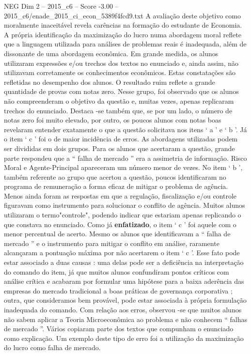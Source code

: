 \begin{textsample}{NEG Dim 2 – 2015\_c6 – Score -3.00 – 2015\_c6/enade\_2015\_ci\_econ\_5389f4fcd9.txt}
A avaliação deste objetivo como moralmente inaceitável revela carências na formação do estudante de Economia.
A própria identificação da maximização do lucro numa abordagem moral reflete que a linguagem utilizada para análises de problemas reais é inadequada, além de dissonante de uma abordagem econômica.
Em grande medida, os alunos utilizaram expressões e/ou trechos dos textos no enunciado e, ainda assim, não utilizavam corretamente os conhecimentos econômicos.
Estas constatações são refletidas no desempenho dos alunos.
O resultado ruim reflete a grande quantidade de provas com notas zero.
Nesse grupo, foi observado que os alunos não compreenderam o objetivo da questão e, muitas vezes, apenas replicaram trechos do enunciado.
Destaca -se também que, se por um lado, o número de notas zero foi muito elevado, por outro, os poucos alunos com notas boas revelaram entender exatamente o que a questão solicitava nos itens ‘ a ’ e ‘ b ’.
Já o item ‘ c ’ foi o de maior incidência de erros.
As abordagens utilizadas podem ser divididas em dois grupos.
Para os alunos que acertaram a questão, grande parte respondeu que a “ falha de mercado ” era a assimetria de informação.
Risco Moral e Agente-Principal apareceram um número menor de vezes.
No item ‘ b ’, também referente ao grupo que acertou a questão, poucos identificaram no programa de remuneração a forma eficaz de mitigar o problema de agência.
Menos ainda foram as respostas em que a regulação, fiscalização e/ou controle figuravam como instrumento para solucionar o conflito de agência.
Muitos alunos utilizaram o termo"controle", podendo indicar que estariam apenas replicando o que constava no enunciado.
Como já \textbf{enfatizado}, o item ‘ c ’ foi aquele com o menor percentual de acerto.
Mesmo os alunos que identificavam a “ falha de mercado ” e o instrumento para mitigar o conflito em análise, raramente alcançaram a pontuação máxima por não acertarem o item ‘ c ’.
Esse fato pode estar associado a duas causas : uma delas pode ser a deficiência na interpretação do comando do item, já que muitos alunos confundiram pontos críticos com análise crítica e acabaram por formular uma hipótese para a baixa aderência das empresas do mercado tradicional a boas práticas de governança corporativa ; outra, que consideramos bem provável, pode estar associada à própria formulação inadequada do comando.
Com relação aos erros, observou -se que muitos alunos não sabem aplicar a Teoria Microeconômica ao problema e não conhecem “ falhas de mercado ”.
Vários copiaram parte dos textos que compunham o enunciado como explicação.
Um exemplo deste tipo de erro foi a utilização da maximização do lucro como falha de mercado.

\end{textsample}
